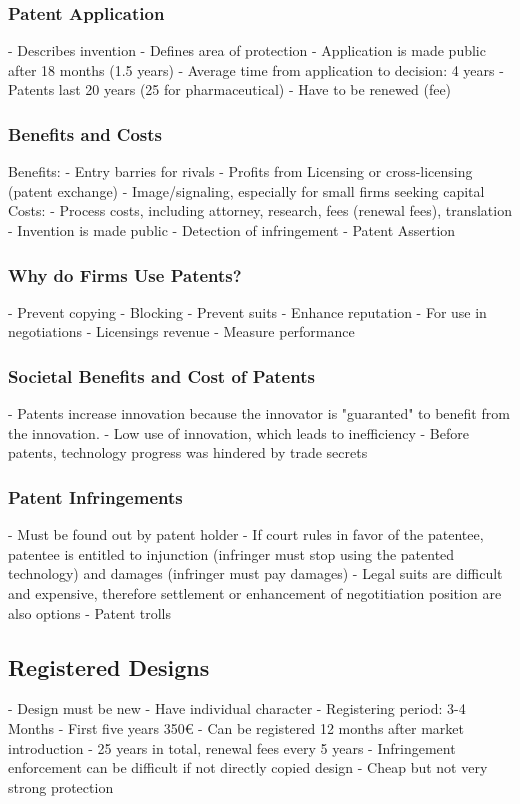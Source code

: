 \documentclass{scrartcl}
\begin{document}
\subsubsection*{Patent Application}
- Describes invention
- Defines area of protection
- Application is made public after 18 months (1.5 years)
- Average time from application to decision: 4 years
- Patents last 20 years (25 for pharmaceutical)
- Have to be renewed (fee)
\subsubsection*{Benefits and Costs}
Benefits:
- Entry barries for rivals
- Profits from Licensing or cross-licensing (patent exchange)
- Image/signaling, especially for small firms seeking capital
Costs:
- Process costs, including attorney, research, fees (renewal fees), translation
- Invention is made public
- Detection of infringement
- Patent Assertion
\subsubsection*{Why do Firms Use Patents?}
- Prevent copying
- Blocking
- Prevent suits
- Enhance reputation
- For use in negotiations
- Licensings revenue
- Measure performance
\subsubsection*{Societal Benefits and Cost of Patents}
- Patents increase innovation because the innovator is "guaranted" to benefit from the innovation.
- Low use of innovation, which leads to inefficiency
- Before patents, technology progress was hindered by trade secrets
\subsubsection*{Patent Infringements}
- Must be found out by patent holder
- If court rules in favor of the patentee, patentee is entitled to injunction (infringer must stop using the patented technology) and damages (infringer must pay damages)
- Legal suits are difficult and expensive, therefore settlement or enhancement of negotitiation position are also options
- Patent trolls
\subsection*{Registered Designs}
- Design must be new
- Have individual character
- Registering period: 3-4 Months
- First five years 350€
- Can be registered 12 months after market introduction
- 25 years in total, renewal fees every 5 years
- Infringement enforcement can be difficult if not directly copied design
- Cheap but not very strong protection
\end{document}
